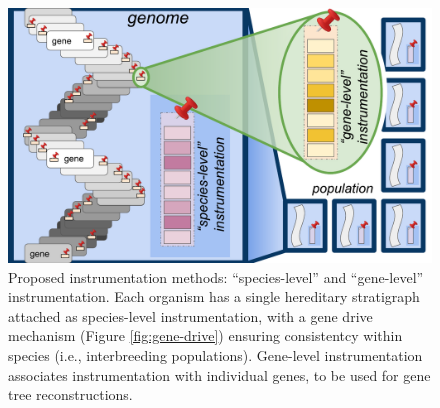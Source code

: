 \begin{figure}
  \centering
  \includegraphics[width=\textwidth]{img/annotation-types}
  \caption{
    Proposed instrumentation methods: ``species-level'' and ``gene-level'' instrumentation.
    Each organism has a single hereditary stratigraph attached as species-level instrumentation, with a gene drive mechanism (Figure \ref{fig:gene-drive}) ensuring consistentcy within species (i.e., interbreeding populations).
    Gene-level instrumentation associates instrumentation with individual genes, to be used for gene tree reconstructions.
  }
  \label{fig:annotation-types}
\end{figure}
